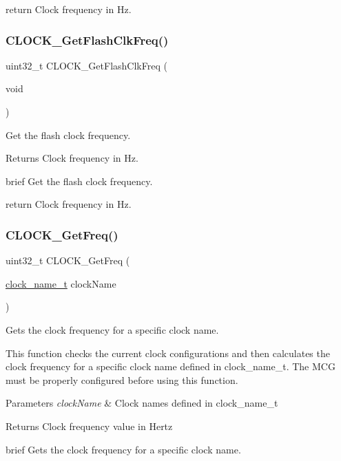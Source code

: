 return Clock frequency in Hz. \mbox{\label{group__clock_gaa64c5e2ea6e2be57582e9868b67ce7ee}} 
\subsubsection{\texorpdfstring{CLOCK\_GetFlashClkFreq()}{CLOCK\_GetFlashClkFreq()}}
{\footnotesize\ttfamily uint32\+\_\+t C\+L\+O\+C\+K\+\_\+\+Get\+Flash\+Clk\+Freq (\begin{DoxyParamCaption}\item[{void}]{ }\end{DoxyParamCaption})}



Get the flash clock frequency. 

\begin{DoxyReturn}{Returns}
Clock frequency in Hz.
\end{DoxyReturn}
brief Get the flash clock frequency.

return Clock frequency in Hz. \mbox{\label{group__clock_ga53acae220d651789bb505c53c73ecf2b}} 
\subsubsection{\texorpdfstring{CLOCK\_GetFreq()}{CLOCK\_GetFreq()}}
{\footnotesize\ttfamily uint32\+\_\+t C\+L\+O\+C\+K\+\_\+\+Get\+Freq (\begin{DoxyParamCaption}\item[{\mbox{\hyperlink{group__clock_gacb9ec0a8b3aa569692b550ebdcac7b3c}{clock\+\_\+name\+\_\+t}}}]{clock\+Name }\end{DoxyParamCaption})}



Gets the clock frequency for a specific clock name. 

This function checks the current clock configurations and then calculates the clock frequency for a specific clock name defined in clock\+\_\+name\+\_\+t. The M\+CG must be properly configured before using this function.


\begin{DoxyParams}{Parameters}
{\em clock\+Name} & Clock names defined in clock\+\_\+name\+\_\+t \\
\hline
\end{DoxyParams}
\begin{DoxyReturn}{Returns}
Clock frequency value in Hertz
\end{DoxyReturn}
brief Gets the clock frequency for a specific clock name.

